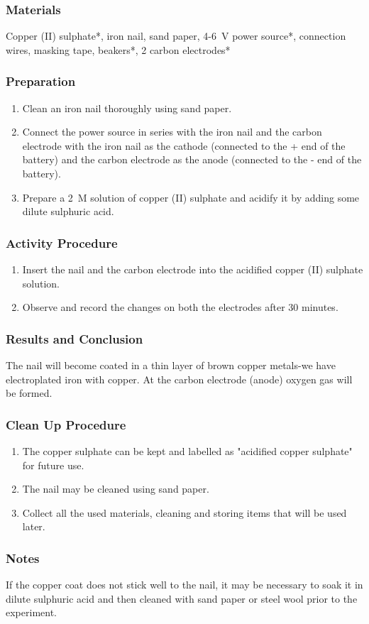 \subsubsection*{Materials}
Copper (II) sulphate*, iron nail, sand paper, 4-6~V  power source*, connection wires, masking tape, beakers*, 2 carbon electrodes*

\subsubsection*{Preparation}
\begin{enumerate}
\item{Clean an iron nail thoroughly using sand paper.}
\item{Connect the power source in series with the iron nail and the carbon electrode with the iron nail as the cathode (connected to the + end of the battery) and the carbon electrode as the anode (connected to the - end of the battery).}
\item{Prepare a 2~M solution of copper (II) sulphate and acidify it by adding some dilute sulphuric acid.}
\end{enumerate}

\subsubsection*{Activity Procedure}
\begin{enumerate}
\item{Insert the nail and the carbon electrode into the acidified copper (II) sulphate solution.}
\item{Observe and record the changes on both the electrodes after 30 minutes.}
\end{enumerate}

\subsubsection*{Results and Conclusion}
The nail will become coated in a thin layer of brown copper metals-we have electroplated iron with copper. At the carbon electrode (anode) oxygen gas will be formed.

\subsubsection*{Clean Up Procedure}
\begin{enumerate}
\item{The copper sulphate can be kept and labelled as "acidified copper sulphate" for future use.}
\item{The nail may be cleaned using sand paper.}
\item{Collect all the used materials, cleaning and storing items that will be used later.}
\end{enumerate}

\subsubsection*{Notes}
If the copper coat does not stick well to the nail, it may be necessary to soak it in dilute sulphuric acid and then cleaned with sand paper or steel wool prior to the experiment.
